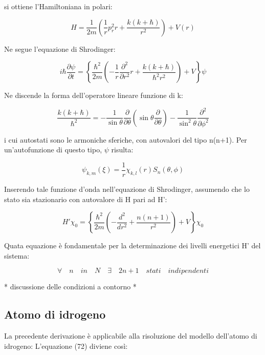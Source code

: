 \documentclass{article}
\begin{document}
si ottiene l'Hamiltoniana in polari:

\begin{equation}
  H=\frac{1}{2m}\left ( \frac{1}{r}p_r^2 r +\frac{k(k+\hbar)}{r^2}\right )+V(r)
\end{equation}

Ne segue l'equazione di Shrodinger:

\begin{equation}
  i\hbar \frac{\partial \psi}{\partial t}= \left \{ \frac{\hbar^2}{2m}\left ( -\frac{1}{r}\frac{\partial^2}{\partial r^2}r+\frac{k(k+\hbar)}{\hbar^2r^2} \right ) +V \right \} \psi
\end{equation}

Ne discende la forma dell'operatore lineare funzione di k:

\begin{equation}
  \frac{k(k+\hbar)}{\hbar^2}= -\frac{1}{\sin{\theta}}\frac{\partial}{\partial \theta}\left ( \sin{\theta}\frac{\partial}{\partial \theta} \right ) - \frac{1}{\sin^2{\theta}}\frac{\partial^2}{\partial \phi^2}
\end{equation}

i cui autostati sono le armoniche sferiche, con autovalori del tipo n(n+1). Per un'autofunzione di questo tipo, $\psi$ risulta:

\begin{equation}
  \psi_{k,m}(\xi)=\frac{1}{r}\chi_{k,l}(r)S_n(\theta, \phi)
\end{equation}

Inserendo tale funzione d'onda nell'equazione di Shrodinger, assumendo che lo stato sia stazionario con autovalore di H pari ad H':

\begin{equation}
  H' \chi_0=\left\{\frac{\hbar^2}{2m}\left( -\frac{d^2}{dr^2}+\frac{n(n+1)}{r^2}\right)+V \right\}\chi_0
\end{equation}

Quata equazione è fondamentale per la determinazione dei livelli energetici H' del sistema:

\begin{equation}
  \forall \quad n \quad in \quad N \quad \exists \quad 2n+1 \quad stati \quad indipendenti
\end{equation}


* discussione delle condizioni a contorno *

\subsection{Atomo di idrogeno}
La precedente derivazione è applicabile alla risoluzione del modello dell'atomo di idrogeno:
L'equazione (72) diviene così:
\end{document}
